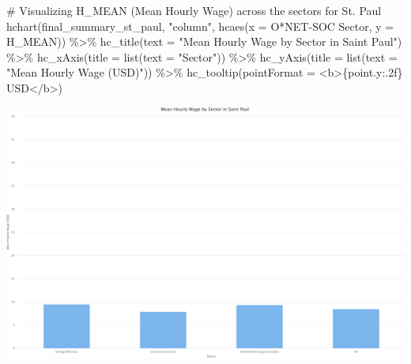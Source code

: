 \documentclass[
  letterpaper,
  DIV=11,
  numbers=noendperiod]{scrartcl}
\newenvironment{Shaded}{\begin{snugshade}}{\end{snugshade}}
\newcommand{\AttributeTok}[1]{\textcolor[rgb]{0.40,0.45,0.13}{#1}}
\newcommand{\CommentTok}[1]{\textcolor[rgb]{0.37,0.37,0.37}{#1}}
\newcommand{\FunctionTok}[1]{\textcolor[rgb]{0.28,0.35,0.67}{#1}}
\newcommand{\NormalTok}[1]{\textcolor[rgb]{0.00,0.23,0.31}{#1}}
\newcommand{\SpecialCharTok}[1]{\textcolor[rgb]{0.37,0.37,0.37}{#1}}
\newcommand{\StringTok}[1]{\textcolor[rgb]{0.13,0.47,0.30}{#1}}
\begin{document}
\begin{Shaded}
\begin{Highlighting}[]
\CommentTok{\# Visualizing H\_MEAN (Mean Hourly Wage) across the sectors for St. Paul}
\FunctionTok{hchart}\NormalTok{(final\_summary\_st\_paul, }\StringTok{"column"}\NormalTok{, }\FunctionTok{hcaes}\NormalTok{(}\AttributeTok{x =} \StringTok{\textasciigrave{}}\AttributeTok{O*NET{-}SOC Sector}\StringTok{\textasciigrave{}}\NormalTok{, }\AttributeTok{y =}\NormalTok{ H\_MEAN)) }\SpecialCharTok{\%\textgreater{}\%}
  \FunctionTok{hc\_title}\NormalTok{(}\AttributeTok{text =} \StringTok{"Mean Hourly Wage by Sector in Saint Paul"}\NormalTok{) }\SpecialCharTok{\%\textgreater{}\%}
  \FunctionTok{hc\_xAxis}\NormalTok{(}\AttributeTok{title =} \FunctionTok{list}\NormalTok{(}\AttributeTok{text =} \StringTok{"Sector"}\NormalTok{)) }\SpecialCharTok{\%\textgreater{}\%}
  \FunctionTok{hc\_yAxis}\NormalTok{(}\AttributeTok{title =} \FunctionTok{list}\NormalTok{(}\AttributeTok{text =} \StringTok{"Mean Hourly Wage (USD)"}\NormalTok{)) }\SpecialCharTok{\%\textgreater{}\%}
  \FunctionTok{hc\_tooltip}\NormalTok{(}\AttributeTok{pointFormat =} \StringTok{\textquotesingle{}\textless{}b\textgreater{}\{point.y:.2f\} USD\textless{}/b\textgreater{}\textquotesingle{}}\NormalTok{)}
\end{Highlighting}
\end{Shaded}

\includegraphics{index_files/figure-pdf/unnamed-chunk-21-2.pdf}
\end{document}
